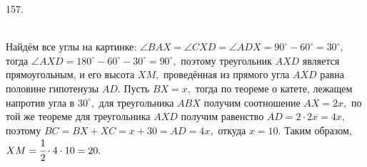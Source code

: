 157. \begin{figure}[ht!]
\end{figure}\\
Найдём все углы на картинке: $\angle BAX=\angle CXD=\angle ADX=90^\circ-60^\circ=30^\circ,$ тогда $\angle AXD=180^\circ-60^\circ-30^\circ=90^\circ,$ поэтому треугольник $AXD$ является прямоугольным, и его высота $XM,$ проведённая из прямого угла $AXD$ равна половине гипотенузы $AD.$ Пусть $BX=x,$ тогда по теореме о катете, лежащем напротив угла в $30^\circ,$ для треугольника $ABX$ получим соотношение $AX=2x,$ по той же теореме для треугольника $AXD$ получим равенство $AD=2\cdot2x=4x,$ поэтому $BC=BX+XC=x+30=AD=4x,$ откуда $x=10.$ Таким образом, $XM=\cfrac{1}{2}\cdot4\cdot10=20.$\\
